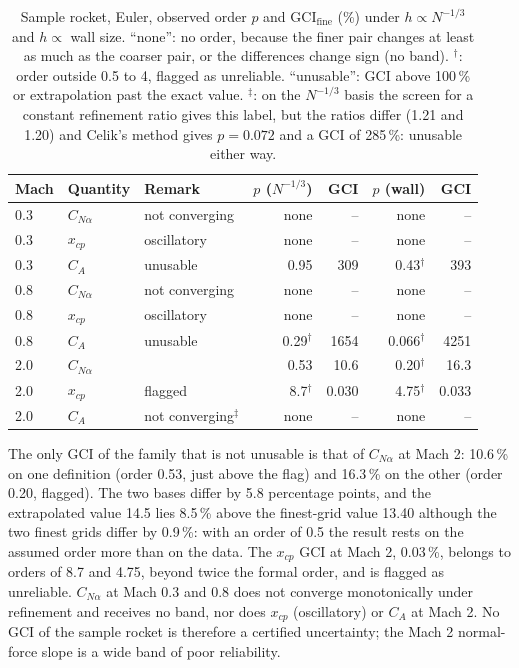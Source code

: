 \documentclass[11pt,a4paper]{article}
\newcommand{\CNa}{C_{N\alpha}}
\newcommand{\fine}{\mathrm{fine}}
\begin{document}
\begin{table}[t]
\centering
\caption{Sample rocket, Euler, observed order $p$ and $\mathrm{GCI}_\fine$ (\%) under $h\propto N^{-1/3}$ and $h\propto$ wall size.
``none'': no order, because the finer pair changes at least as much as the coarser pair, or the differences change sign (no band).
$^\dagger$: order outside 0.5 to 4, flagged as unreliable. ``unusable'': GCI above 100\,\% or extrapolation past the exact value.
$^\ddagger$: on the $N^{-1/3}$ basis the screen for a constant refinement ratio gives this label, but the ratios differ (1.21 and 1.20) and Celik's method gives $p=0.072$ and a GCI of 285\,\%: unusable either way.}
\label{tab:sample}
\footnotesize
\setlength{\tabcolsep}{4pt}
\begin{tabular}{@{}lllrrrr@{}}
\toprule
Mach & Quantity & Remark & $p$ ($N^{-1/3}$) & GCI & $p$ (wall) & GCI \\
\midrule
0.3 & $\CNa$ & not converging & none & -- & none & -- \\
0.3 & $x_{cp}$ & oscillatory & none & -- & none & -- \\
0.3 & $C_A$ & unusable & 0.95 & 309 & 0.43$^\dagger$ & 393 \\
0.8 & $\CNa$ & not converging & none & -- & none & -- \\
0.8 & $x_{cp}$ & oscillatory & none & -- & none & -- \\
0.8 & $C_A$ & unusable & 0.29$^\dagger$ & 1654 & 0.066$^\dagger$ & 4251 \\
2.0 & $\CNa$ & & 0.53 & 10.6 & 0.20$^\dagger$ & 16.3 \\
2.0 & $x_{cp}$ & flagged & 8.7$^\dagger$ & 0.030 & 4.75$^\dagger$ & 0.033 \\
2.0 & $C_A$ & not converging$^\ddagger$ & none & -- & none & -- \\
\bottomrule
\end{tabular}
\end{table}

The only GCI of the family that is not unusable is that of $\CNa$ at Mach 2: 10.6\,\% on one definition (order 0.53, just above the flag) and 16.3\,\% on the other (order 0.20, flagged).
The two bases differ by 5.8 percentage points, and the extrapolated value 14.5 lies 8.5\,\% above the finest-grid value 13.40 although the two finest grids differ by 0.9\,\%: with an order of 0.5 the result rests on the assumed order
more than on the data.
The $x_{cp}$ GCI at Mach 2, 0.03\,\%, belongs to orders of 8.7 and 4.75, beyond twice the formal order, and is flagged as unreliable.
$\CNa$ at Mach 0.3 and 0.8 does not converge monotonically under refinement and receives no band, nor does $x_{cp}$ (oscillatory) or $C_A$ at Mach 2.
No GCI of the sample rocket is therefore a certified uncertainty; the Mach 2 normal-force slope is a wide band of poor reliability.
\end{document}
